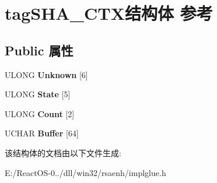 \hypertarget{structtag_s_h_a___c_t_x}{}\section{tag\+S\+H\+A\+\_\+\+C\+T\+X结构体 参考}
\label{structtag_s_h_a___c_t_x}
\subsection*{Public 属性}
\begin{DoxyCompactItemize}
\item 
\mbox{\label{structtag_s_h_a___c_t_x_acb3fa24b55336c487867332987457ed2}} 
U\+L\+O\+NG {\bfseries Unknown} \mbox{[}6\mbox{]}
\item 
\mbox{\label{structtag_s_h_a___c_t_x_a129f98d64b0f883aebc73eaa5d9f2406}} 
U\+L\+O\+NG {\bfseries State} \mbox{[}5\mbox{]}
\item 
\mbox{\label{structtag_s_h_a___c_t_x_a7269ef3729ac6d3f8b9696289fa238c3}} 
U\+L\+O\+NG {\bfseries Count} \mbox{[}2\mbox{]}
\item 
\mbox{\label{structtag_s_h_a___c_t_x_aa4430e044eb2bc2fd9855c320d0d4cf4}} 
U\+C\+H\+AR {\bfseries Buffer} \mbox{[}64\mbox{]}
\end{DoxyCompactItemize}


该结构体的文档由以下文件生成\+:\begin{DoxyCompactItemize}
\item 
E\+:/\+React\+O\+S-\/0../dll/win32/rsaenh/implglue.\+h\end{DoxyCompactItemize}
